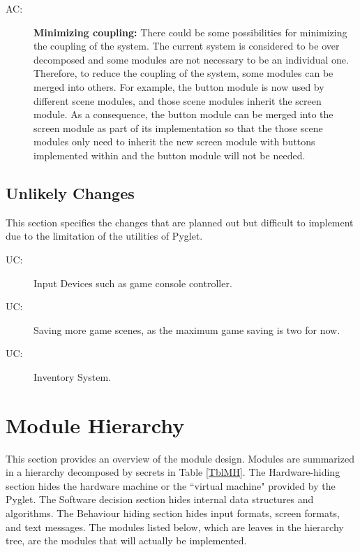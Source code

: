 \documentclass[12pt, titlepage]{article}
\newcounter{acnum}
\newcommand{\actheacnum}{AC\theacnum}
\newcounter{ucnum}
\newcommand{\uctheucnum}{UC\theucnum}
\begin{document}
\begin{description}
\item[ \actheacnum \label{aiHardware}:] \textbf{Minimizing coupling: }There could be some possibilities for minimizing the coupling of the system. The current system is considered to be over decomposed and some modules are not necessary to be an individual one. Therefore, to reduce the coupling of the system, some modules can be merged into others. For example, the button module is now used by different scene modules, and those scene modules inherit the screen module. As a consequence, the button module can be merged into the screen module as part of its implementation so that the those scene modules only need to inherit the new screen module with buttons implemented within and the button module will not be needed. 
\end{description}

\subsection{Unlikely Changes} \label{SecUchange}
This section specifies the changes that are planned out but difficult to implement due to the limitation of the utilities of Pyglet.

\begin{description}
\item[ \uctheucnum \label{ucIO}:] Input Devices such as game console controller.
\item[ \uctheucnum \label{ucSave}:] Saving more game scenes, as the maximum game saving is two for now.
\item[ \uctheucnum \label{ucInventory}:] Inventory System.
\end{description}

\section{Module Hierarchy} \label{SecMH}

This section provides an overview of the module design. Modules are summarized
in a hierarchy decomposed by secrets in Table \ref{TblMH}. The Hardware-hiding section hides the hardware machine or the ``virtual machine" provided by the Pyglet. The Software decision section hides internal data structures and algorithms. The Behaviour hiding section hides input formats, screen formats, and text messages. The modules listed
below, which are leaves in the hierarchy tree, are the modules that will
actually be implemented.
\end{document}
